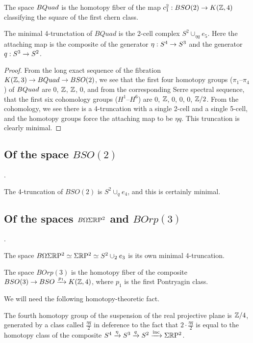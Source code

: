 \documentclass{amsart}
\begin{document}
\begin{definition}
The space $BQuad$ is the homotopy fiber of the map $c_1^2: BSO(2) \rightarrow K(\mathbb Z,4)$ classifying the square of the first chern class.
\end{definition}


\begin{proposition} \label{prop-quadtrunc}
The minimal 4-trunctation of $BQuad$ is the 2-cell complex $S^2 \cup_{\eta q} e_5$.  Here the attaching map is the composite of the generator $\eta: S^4 \rightarrow S^3$ and the generator $q: S^3 \rightarrow S^2$.
\end{proposition}

\begin{proof}
From the long exact sequence of the fibration $K(\mathbb Z,3) \rightarrow BQuad \rightarrow BSO(2)$, we see that the first four homotopy groups ($\pi_1$--$\pi_4$) of $BQuad$ are $0$, $\mathbb Z$, $\mathbb Z$, $0$, and from the corresponding Serre spectral sequence, that the first six cohomology groups ($H^1$--$H^6$) are $0$, $\mathbb Z$, $0$, $0$, $0$, $\mathbb Z/2$.  From the cohomology, we see there is a 4-truncation with a single 2-cell and a single 5-cell, and the homotopy groups force the attaching map to be $\eta q$.  This truncation is clearly minimal.
\end{proof}

\subsection{Of the space $BSO(2)$}.

The 4-truncation of $BSO(2)$ is $S^2 \cup_q e_4$, and this is certainly minimal.

\subsection{Of the spaces $B \Omega \Sigma \mathbb R \mathrm{P}^2$ and $B Orp(3)$}.

The space $B \Omega \Sigma \mathbb R \mathrm{P}^2 \simeq \Sigma \mathbb R \mathrm{P}^2 \simeq S^2 \cup_2 e_3$ is its own minimal 4-truncation.

\begin{definition}
The space $BOrp(3)$ is the homotopy fiber of the composite $BSO(3) \rightarrow BSO \xrightarrow{p_1} K(\mathbb Z,4)$, where $p_1$ is the first Pontryagin class.
\end{definition}

We will need the following homotopy-theoretic fact.
\begin{proposition}
The fourth homotopy group of the suspension of the real projective plane is $\mathbb Z/4$, generated by a class called $\frac{\eta q}{2}$ in deference to the fact that $2 \cdot \frac{\eta q}{2}$ is equal to the homotopy class of the composite $S^4 \xrightarrow{\eta} S^3 \xrightarrow{q} S^2 \xrightarrow{\text{inc}} \Sigma \mathbb R \mathrm{P}^2$.
\end{proposition}
\end{document}
